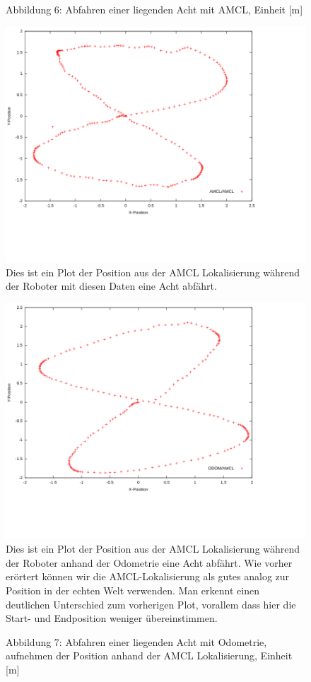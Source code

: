\documentclass[11pt,a4paper]{article}
\begin{document}
\begin{figure}[H]
  \caption*{Abbildung 6: Abfahren einer liegenden Acht mit AMCL, Einheit [m]}
  \includegraphics[scale = 0.45]{Plots/better ones/amclamclacht.png}
  \vspace{-20mm}
\\ Dies ist ein Plot der Position aus der AMCL Lokalisierung während der Roboter mit diesen Daten eine Acht abfährt.
  \caption*{Abbildung 7: Abfahren einer liegenden Acht mit Odometrie, aufnehmen der Position anhand der AMCL Lokalisierung, Einheit [m]}
  \includegraphics[scale = 0.45]{Plots/better ones/odomamclacht.png}
  \vspace{-20mm}
\\ Dies ist ein Plot der Position aus der AMCL Lokalisierung während der Roboter anhand der Odometrie eine Acht abfährt. Wie vorher erörtert können wir die AMCL-Lokalisierung als gutes analog zur Position in der echten Welt verwenden. 
Man erkennt einen deutlichen Unterschied zum vorherigen Plot, vorallem dass hier die Start- und Endposition weniger übereinstimmen.
  \centering
\end{figure}

\end{document}
